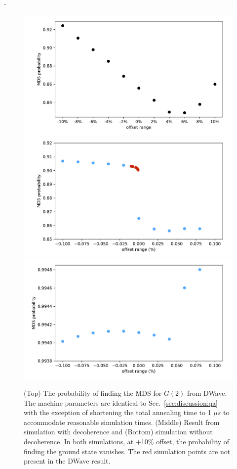 -\documentclass[prd,twocolumn,tightenlines,preprintnumbers,showpacs,superscriptaddress,notitlepage,nofootinbib,eqsecnum,floatfix,longbibliography]{revtex4}
\begin{document}
\begin{figure}
    \centering
    \includegraphics[width=\columnwidth]{./figures/dwave1us.pdf}
    \includegraphics[width=\columnwidth]{./figures/sim_deco.pdf}
    \includegraphics[width=\columnwidth]{./figures/sim_nodeco.pdf}
    \caption{ (Top) The probability of finding the MDS for $G(2)$ from DWave.
The machine parameters are identical to Sec.~\ref{sec:discussion:qa} with the exception of shortening the total annealing time to 1 $\mu s$ to accommodate reasonable simulation times.
(Middle) Result from simulation with decoherence and (Bottom) simulation without decoherence.
In both simulations, at +10\% offset, the probability of finding the ground state vanishes.
The red simulation points are not present in the DWave result.}
    \label{fig:dwave1us}
\end{figure}
\end{document}
